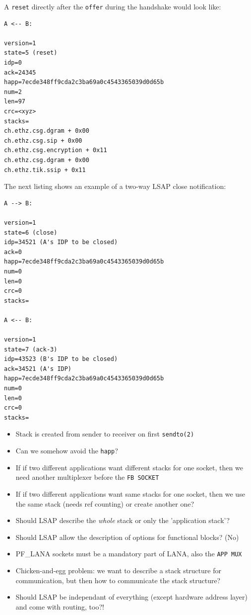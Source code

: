 \documentclass[times,10pt,twocolumn]{article}
\begin{document}
A \texttt{reset} directly after the \texttt{offer} during the handshake would
look like:
\scriptsize{
\begin{lstlisting}
A <-- B:

version=1
state=5 (reset)
idp=0
ack=24345
happ=7ecde348ff9cda2c3ba69a0c4543365039d0d65b
num=2
len=97
crc=<xyz>
stacks=
ch.ethz.csg.dgram + 0x00
ch.ethz.csg.sip + 0x00
ch.ethz.csg.encryption + 0x11
ch.ethz.csg.dgram + 0x00
ch.ethz.tik.ssip + 0x11
\end{lstlisting}
}
\normalsize

The next listing shows an example of a two-way LSAP close notification:
\scriptsize{
\begin{lstlisting}
A --> B:

version=1
state=6 (close)
idp=34521 (A's IDP to be closed)
ack=0
happ=7ecde348ff9cda2c3ba69a0c4543365039d0d65b
num=0
len=0
crc=0
stacks=

A <-- B:

version=1
state=7 (ack-3)
idp=43523 (B's IDP to be closed)
ack=34521 (A's IDP)
happ=7ecde348ff9cda2c3ba69a0c4543365039d0d65b
num=0
len=0
crc=0
stacks=
\end{lstlisting}
}
\normalsize

\label{iss}
\begin{itemize}
        \setlength{\itemsep}{-1mm}
	\item Stack is created from sender to receiver on first \texttt{sendto(2)}
	\item Can we somehow avoid the \texttt{happ}?
	\item If if two different applications want different stacks for one
	      socket, then we need another multiplexer before the \texttt{FB SOCKET}
	\item If if two different applications want same stacks for one
	      socket, then we use the same stack (needs ref counting) or create
	      another one?
	\item Should LSAP describe the \textit{whole} stack or only the 'application stack'?
	\item Should LSAP allow the description of options for functional blocks? (No)
	\item PF\_LANA sockets must be a mandatory part of LANA, also the \texttt{APP MUX}
	\item Chicken-and-egg problem: we want to describe a stack structure for
              communication, but then how to communicate the stack structure?
	\item Should LSAP be independant of everything (except hardware address
	      layer) and come with routing, too?!
\end{itemize}
\end{document}
